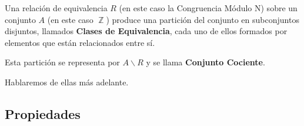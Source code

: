 \documentclass[12pt]{report}                                    %
\DeclareMathOperator \Integers  {\mathbb{Z}}                     %
\begin{document}
            Una relación de equivalencia $R$ (en este caso la Congruencia Módulo N)
            sobre un conjunto $A$ (en este caso $\Integers$) produce una partición
            del conjunto en subconjuntos disjuntos, llamados \textbf{Clases de
            Equivalencia}, cada uno de ellos formados por elementos que están
            relacionados entre sí.

            Esta partición se representa por $A \backslash R$ y se llama
            \textbf{Conjunto Cociente}.

            Hablaremos de ellas más adelante.



        \clearpage
        \subsection{Propiedades}
\end{document}
